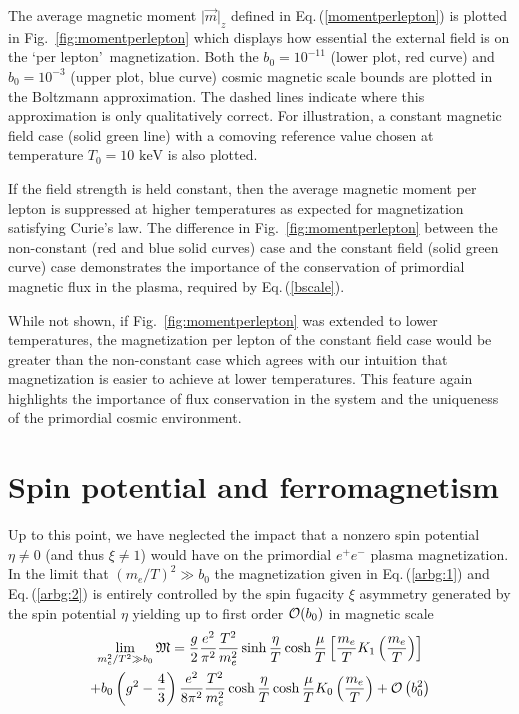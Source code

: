 \documentclass[aps,prd,floatfix,reprint]{revtex4-2}
\newcommand*{\keV}{\text{ keV}}
\newcommand{\req}[1]{Eq.\,(\ref{#1})}
\newcommand{\rf}[1]{Fig.~{\ref{#1}}}
\begin{document}
The average magnetic moment $\vert\vec{m}\vert_{z}$ defined in \req{momentperlepton} is plotted in \rf{fig:momentperlepton} which displays how essential the external field is on the \lq per lepton\rq\ magnetization. Both the $b_{0}=10^{-11}$ (lower plot, red curve) and $b_{0}=10^{-3}$ (upper plot, blue curve) cosmic magnetic scale bounds are plotted in the Boltzmann approximation. The dashed lines indicate where this approximation is only qualitatively correct. For illustration, a constant magnetic field case (solid green line) with a comoving reference value chosen at temperature $T_{0}=10\keV$ is also plotted.

If the field strength is held constant, then the average magnetic moment per lepton is suppressed at higher temperatures as expected for magnetization satisfying Curie's law. The difference in \rf{fig:momentperlepton} between the non-constant (red and blue solid curves) case and the constant field (solid green curve) case demonstrates the importance of the conservation of primordial magnetic flux in the plasma, required by \req{bscale}.

While not shown, if \rf{fig:momentperlepton} was extended to lower temperatures, the magnetization per lepton of the constant field case would be greater than the non-constant case which agrees with our intuition that magnetization is easier to achieve at lower temperatures. This feature again highlights the importance of flux conservation in the system and the uniqueness of the primordial cosmic environment.

\section{Spin potential and ferromagnetism}
\label{sec:ferro}
\noindent Up to this point, we have neglected the impact that a nonzero spin potential $\eta\neq0$ (and thus $\xi\neq1$) would have on the primordial $e^{+}e^{-}$ plasma magnetization. In the limit that $(m_{e}/T)^2\gg b_0$ the magnetization given in \req{arbg:1} and \req{arbg:2} is entirely controlled by the spin fugacity $\xi$ asymmetry generated by the spin potential $\eta$ yielding up to first order ${\cal O}(b_{0})$ in magnetic scale
\begin{multline}
 \label{ferro}
 \lim_{m_{e}^{2}/T^{2}\gg b_0}{\mathfrak M}=\frac{g}{2}\frac{e^{2}}{\pi^{2}}\frac{T^{2}}{m_{e}^{2}}\sinh{\frac{\eta}{T}}\cosh{\frac{\mu}{T}}\left[\frac{m_{e}}{T}K_{1}\left(\frac{m_{e}}{T}\right)\right]\\
 +b_{0}\left(g^{2}-\frac{4}{3}\right)\frac{e^{2}}{8\pi^{2}}\frac{T^{2}}{m_{e}^{2}}\cosh{\frac{\eta}{T}}\cosh{\frac{\mu}{T}}K_{0}\left(\frac{m_{e}}{T}\right)
 +{\cal O}\left(b_{0}^{2}\right)
\end{multline}
\end{document}
